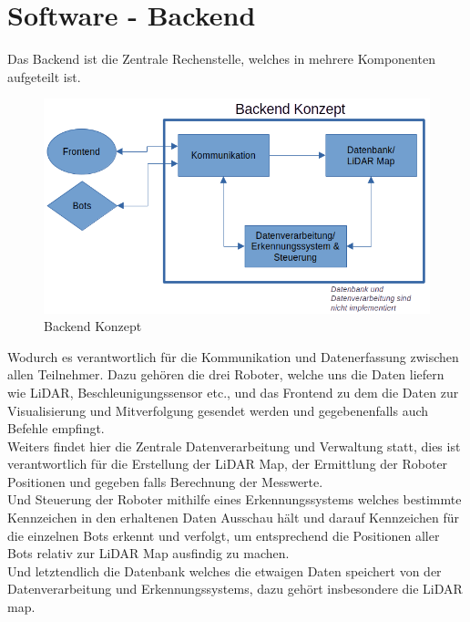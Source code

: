 

\chapter{Software - Backend}
\label{sec:software_backend}
Das Backend ist die Zentrale Rechenstelle, welches in mehrere Komponenten aufgeteilt ist.

\begin{figure}[H]
    \includegraphics[width=\textwidth, center]{img/backend-konzept.png}
    \caption{Backend Konzept}
    \label{fig:backend_konzept}
\end{figure}

Wodurch es verantwortlich für die Kommunikation und Datenerfassung zwischen allen Teilnehmer. 
Dazu gehören die drei Roboter, welche uns die Daten liefern wie LiDAR, Beschleunigungssensor etc., 
und das Frontend zu dem die Daten zur Visualisierung und Mitverfolgung gesendet werden 
und gegebenenfalls auch Befehle empfingt.
\\
Weiters findet hier die Zentrale Datenverarbeitung und Verwaltung statt, 
dies ist verantwortlich für die Erstellung der LiDAR Map, 
der Ermittlung der Roboter Positionen 
und gegeben falls Berechnung der Messwerte. 
\\
Und Steuerung der Roboter mithilfe eines Erkennungssystems 
welches bestimmte Kennzeichen in den erhaltenen Daten Ausschau hält und 
darauf Kennzeichen für die einzelnen Bots erkennt und verfolgt, 
um entsprechend die Positionen aller Bots relativ zur LiDAR Map ausfindig zu machen.
% 
\\
Und letztendlich die Datenbank welches die etwaigen Daten speichert 
von der Datenverarbeitung und Erkennungssystems, 
dazu gehört insbesondere die LiDAR map.

